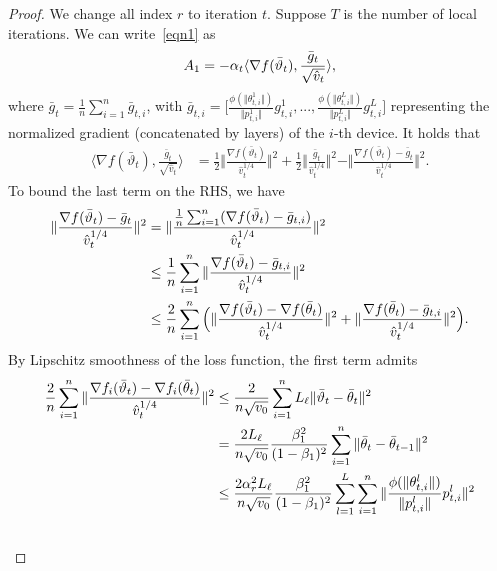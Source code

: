 \documentclass[twoside]{article}
\begin{document}
\begin{proof}
 We change all index $r$ to iteration $t$. 
 Suppose $T$ is the number of local iterations. We can write~\eqref{eqn1} as
 \begin{align}\notag
     A_1=-\alpha_t \langle \nabla f(\bar \vartheta_t),\frac{\bar g_t}{\sqrt{\hat v_t}} \rangle,
 \end{align}
 where $\bar g_t=\frac{1}{n}\sum_{i=1}^n \bar g_{t,i}$, with $\bar g_{t,i}=\Big[\frac{\phi(\Vert \theta_{t,i}^1\Vert)}{\Vert p_{t,i}^1\Vert}g_{t,i}^1,..., \frac{\phi(\Vert \theta_{t,i}^L\Vert)}{\Vert p_{t,i}^L\Vert}g_{t,i}^L   \Big]$ representing the normalized gradient (concatenated by layers) of the $i$-th device. It holds that
 \begin{align}
     \langle \nabla f(\bar \vartheta_t),\frac{\bar g_t}{\sqrt{\hat v_t}} \rangle&=\frac{1}{2}\Vert \frac{\nabla f(\bar\vartheta_t) }{\hat v_t^{1/4}}\Vert^2+\frac{1}{2}\Vert \frac{\bar g_t }{\hat v_t^{1/4}}\Vert^2-\Vert \frac{\nabla f(\bar\vartheta_t)-\bar g_t }{\hat v_t^{1/4}}\Vert^2.  \label{eqn:x1}
 \end{align}
 To bound the last term on the RHS, we have
 \begin{align}\notag
     \Vert \frac{\nabla f(\bar\vartheta_t)-\bar g_t }{\hat v_t^{1/4}}\Vert^2&=\Vert \frac{\frac{1}{n}\sum_{i=1}^n (\nabla f(\bar\vartheta_t)-\bar g_{t,i})}{\hat v_t^{1/4}} \Vert^2\\\notag
     &\leq \frac{1}{n}\sum_{i=1}^n\Vert \frac{\nabla f(\bar\vartheta_t)-\bar g_{t,i}}{\hat v_t^{1/4}} \Vert^2\\\notag
     &\leq \frac{2}{n}\sum_{i=1}^n \Big(\Vert \frac{\nabla f(\bar\vartheta_t)-\nabla f(\bar\theta_t)}{\hat v_t^{1/4}} \Vert^2+\Vert \frac{\nabla f(\bar\theta_t)-\bar g_{t,i}}{\hat v_t^{1/4}} \Vert^2  \Big). 
 \end{align}
 By Lipschitz smoothness of the loss function, the first term admits
 \begin{align}\notag
     \frac{2}{n}\sum_{i=1}^n\Vert \frac{\nabla f_i(\bar\vartheta_t)-\nabla f_i(\bar\theta_t)}{\hat v_t^{1/4}} \Vert^2&\leq \frac{2}{n \sqrt{v_0}}\sum_{i=1}^n L_\ell\Vert \bar\vartheta_t-\bar\theta_t\Vert^2  \\\notag
     &=\frac{2L_\ell}{n \sqrt{v_0}}\frac{\beta_1^2}{(1-\beta_1)^2}\sum_{i=1}^n \Vert \bar\theta_t-\bar\theta_{t-1}\Vert ^2\\\notag
     &\leq \frac{2\alpha_r^2 L_\ell }{n \sqrt{v_0}}\frac{\beta_1^2}{(1-\beta_1)^2} \sum_{l=1}^L \sum_{i=1}^n\Vert \frac{\phi(\Vert \theta_{t,i}^l\Vert)}{\Vert p_{t,i}^l\Vert}p_{t,i}^l \Vert^2\\\notag

\end{align}
\end{proof}
\end{document}

